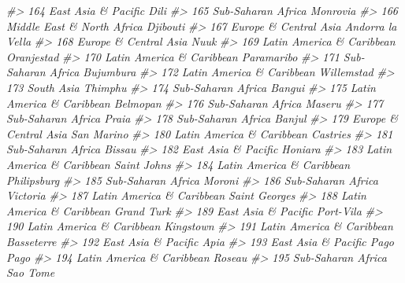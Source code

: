 \documentclass[
  xelatex, ja=standard]{bxjsbook}
\newenvironment{Shaded}{\begin{snugshade}}{\end{snugshade}}
\newcommand{\CommentTok}[1]{\textcolor[rgb]{0.56,0.35,0.01}{\textit{#1}}}
\theoremstyle{definition}
\theoremstyle{definition}
\theoremstyle{definition}
\theoremstyle{definition}
\theoremstyle{remark}
\begin{document}
\begin{Shaded}
\begin{Highlighting}[]
\CommentTok{\#\textgreater{} 164        East Asia \& Pacific                Dili}
\CommentTok{\#\textgreater{} 165         Sub{-}Saharan Africa            Monrovia}
\CommentTok{\#\textgreater{} 166 Middle East \& North Africa            Djibouti}
\CommentTok{\#\textgreater{} 167      Europe \& Central Asia    Andorra la Vella}
\CommentTok{\#\textgreater{} 168      Europe \& Central Asia                Nuuk}
\CommentTok{\#\textgreater{} 169  Latin America \& Caribbean          Oranjestad}
\CommentTok{\#\textgreater{} 170  Latin America \& Caribbean          Paramaribo}
\CommentTok{\#\textgreater{} 171         Sub{-}Saharan Africa           Bujumbura}
\CommentTok{\#\textgreater{} 172  Latin America \& Caribbean          Willemstad}
\CommentTok{\#\textgreater{} 173                 South Asia             Thimphu}
\CommentTok{\#\textgreater{} 174         Sub{-}Saharan Africa              Bangui}
\CommentTok{\#\textgreater{} 175  Latin America \& Caribbean            Belmopan}
\CommentTok{\#\textgreater{} 176         Sub{-}Saharan Africa              Maseru}
\CommentTok{\#\textgreater{} 177         Sub{-}Saharan Africa               Praia}
\CommentTok{\#\textgreater{} 178         Sub{-}Saharan Africa              Banjul}
\CommentTok{\#\textgreater{} 179      Europe \& Central Asia          San Marino}
\CommentTok{\#\textgreater{} 180  Latin America \& Caribbean            Castries}
\CommentTok{\#\textgreater{} 181         Sub{-}Saharan Africa              Bissau}
\CommentTok{\#\textgreater{} 182        East Asia \& Pacific             Honiara}
\CommentTok{\#\textgreater{} 183  Latin America \& Caribbean        Saint John\textquotesingle{}s}
\CommentTok{\#\textgreater{} 184  Latin America \& Caribbean         Philipsburg}
\CommentTok{\#\textgreater{} 185         Sub{-}Saharan Africa              Moroni}
\CommentTok{\#\textgreater{} 186         Sub{-}Saharan Africa            Victoria}
\CommentTok{\#\textgreater{} 187  Latin America \& Caribbean      Saint George\textquotesingle{}s}
\CommentTok{\#\textgreater{} 188  Latin America \& Caribbean          Grand Turk}
\CommentTok{\#\textgreater{} 189        East Asia \& Pacific           Port{-}Vila}
\CommentTok{\#\textgreater{} 190  Latin America \& Caribbean           Kingstown}
\CommentTok{\#\textgreater{} 191  Latin America \& Caribbean          Basseterre}
\CommentTok{\#\textgreater{} 192        East Asia \& Pacific                Apia}
\CommentTok{\#\textgreater{} 193        East Asia \& Pacific           Pago Pago}
\CommentTok{\#\textgreater{} 194  Latin America \& Caribbean              Roseau}
\CommentTok{\#\textgreater{} 195         Sub{-}Saharan Africa            Sao Tome}

\end{Highlighting}
\end{Shaded}
\end{document}
